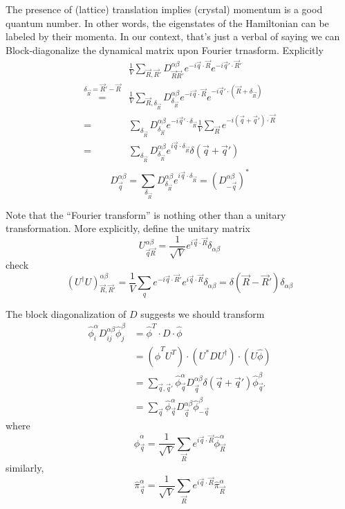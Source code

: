 The presence of (lattice) translation implies (crystal) momentum is a good quantum number. In other words, the eigenstates of the Hamiltonian can be labeled by their momenta. In our context, that's just a verbal of saying we can Block-diagonalize the dynamical matrix upon Fourier trnasform. Explicitly
\begin{align*}
    &\frac{1}{V}\sum_{\vec{R},\vec{R}'}{D_{\vec{R}\vec{R}'}^{\alpha \beta}e^{-i\vec{q}\cdot \vec{R}}e^{-i\vec{q}'\cdot \vec{R}'}}\\
    \stackrel{\delta _{\vec{R}}=\vec{R}'-\vec{R}}{=}&\frac{1}{V}\sum_{\vec{R},\delta _{\vec{R}}}{D_{\delta _{\vec{R}}}^{\alpha \beta}e^{-i\vec{q}\cdot \vec{R}}e^{-i\vec{q}'\cdot \left( \vec{R}+\delta _{\vec{R}} \right)}}\\
    =&\sum_{\delta _{\vec{R}}}{D_{\delta _{\vec{R}}}^{\alpha \beta}e^{-i\vec{q}'\cdot \delta _{\vec{R}}}\frac{1}{V}\sum_{\vec{R}}{e^{-i\left( \vec{q}+\vec{q}' \right) \cdot \vec{R}}}}\\
    =&\sum_{\delta _{\vec{R}}}{D_{\delta _{\vec{R}}}^{\alpha \beta}e^{i\vec{q}\cdot \delta _{\vec{R}}}}\delta \left( \vec{q}+\vec{q}' \right) \\
\end{align*}
\[ D_{\vec{q}}^{\alpha \beta}=\sum_{\delta _{\vec{R}}}{D_{\delta _{\vec{R}}}^{\alpha \beta}e^{i\vec{q}\cdot \delta _{\vec{R}}}}=\left( D_{-\vec{q}}^{\alpha \beta} \right) ^*\]

Note that the ``Fourier transform'' is nothing other than a unitary transformation. More explicitly, define the unitary matrix
\[ U_{\vec{q}\vec{R}}^{\alpha \beta}=\frac{1}{\sqrt{V}}e^{i\vec{q}\cdot \vec{R}}\delta _{\alpha \beta}\]
check
\[ \left( U^{\dagger}U \right) _{\vec{R},\vec{R}'}^{\alpha \beta}=\frac{1}{V}\sum_q{e^{-i\vec{q}\cdot \vec{R}'}e^{i\vec{q}\cdot \vec{R}}\delta _{\alpha \beta}}=\delta \left( \vec{R}-\vec{R}' \right) \delta _{\alpha \beta}\]

The block diagonalization of $D$ suggests we should transform
\begin{align*}
    \hat{\phi}_{i}^{\alpha}D_{ij}^{\alpha \beta}\hat{\phi}_{j}^{\beta}&=\hat{\phi}^T\cdot D\cdot \hat{\phi}\\
    &=\left( \hat{\phi}^TU^T \right) \cdot \left( U^*DU^{\dagger} \right) \cdot \left( U\hat{\phi} \right) \\
    &=\sum_{\vec{q},\vec{q}'}{\hat{\phi}_{\vec{q}}^{\alpha}D_{\vec{q}}^{\alpha \beta}\delta \left( \vec{q}+\vec{q}' \right) \hat{\phi}_{\vec{q}'}^{\beta}}\\
    &=\sum_{\vec{q}}{\hat{\phi}_{\vec{q}}^{\alpha}D_{\vec{q}}^{\alpha \beta}\hat{\phi}_{-\vec{q}}^{\beta}}
\end{align*}
where
\[ \hat{\phi}_{\vec{q}}^{\alpha}=\frac{1}{\sqrt{V}}\sum_{\vec{R}}{e^{i\vec{q}\cdot \vec{R}}\hat{\phi}_{\vec{R}}^{\alpha}} \]
similarly,
\[ \hat{\pi}_{\vec{q}}^{\alpha}=\frac{1}{\sqrt{V}}\sum_{\vec{R}}{e^{i\vec{q}\cdot \vec{R}}\hat{\pi}_{\vec{R}}^{\alpha}} \]

